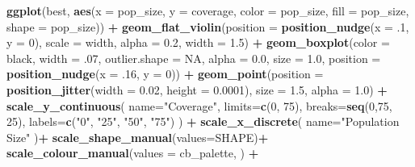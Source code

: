 \documentclass[
]{book}
\newenvironment{Shaded}{\begin{snugshade}}{\end{snugshade}}
\newcommand{\AttributeTok}[1]{\textcolor[rgb]{0.13,0.29,0.53}{#1}}
\newcommand{\ConstantTok}[1]{\textcolor[rgb]{0.56,0.35,0.01}{#1}}
\newcommand{\DecValTok}[1]{\textcolor[rgb]{0.00,0.00,0.81}{#1}}
\newcommand{\FloatTok}[1]{\textcolor[rgb]{0.00,0.00,0.81}{#1}}
\newcommand{\FunctionTok}[1]{\textcolor[rgb]{0.13,0.29,0.53}{\textbf{#1}}}
\newcommand{\NormalTok}[1]{#1}
\newcommand{\SpecialCharTok}[1]{\textcolor[rgb]{0.81,0.36,0.00}{\textbf{#1}}}
\newcommand{\StringTok}[1]{\textcolor[rgb]{0.31,0.60,0.02}{#1}}
\begin{document}
\begin{Shaded}
\begin{Highlighting}[]
\FunctionTok{ggplot}\NormalTok{(best, }\FunctionTok{aes}\NormalTok{(}\AttributeTok{x =}\NormalTok{ pop\_size, }\AttributeTok{y =}\NormalTok{ coverage, }\AttributeTok{color =}\NormalTok{ pop\_size, }\AttributeTok{fill =}\NormalTok{ pop\_size, }\AttributeTok{shape =}\NormalTok{ pop\_size)) }\SpecialCharTok{+}
  \FunctionTok{geom\_flat\_violin}\NormalTok{(}\AttributeTok{position =} \FunctionTok{position\_nudge}\NormalTok{(}\AttributeTok{x =}\NormalTok{ .}\DecValTok{1}\NormalTok{, }\AttributeTok{y =} \DecValTok{0}\NormalTok{), }\AttributeTok{scale =} \StringTok{\textquotesingle{}width\textquotesingle{}}\NormalTok{, }\AttributeTok{alpha =} \FloatTok{0.2}\NormalTok{, }\AttributeTok{width =} \FloatTok{1.5}\NormalTok{) }\SpecialCharTok{+}
  \FunctionTok{geom\_boxplot}\NormalTok{(}\AttributeTok{color =} \StringTok{\textquotesingle{}black\textquotesingle{}}\NormalTok{, }\AttributeTok{width =}\NormalTok{ .}\DecValTok{07}\NormalTok{, }\AttributeTok{outlier.shape =} \ConstantTok{NA}\NormalTok{, }\AttributeTok{alpha =} \FloatTok{0.0}\NormalTok{, }\AttributeTok{size =} \FloatTok{1.0}\NormalTok{, }\AttributeTok{position =} \FunctionTok{position\_nudge}\NormalTok{(}\AttributeTok{x =}\NormalTok{ .}\DecValTok{16}\NormalTok{, }\AttributeTok{y =} \DecValTok{0}\NormalTok{)) }\SpecialCharTok{+}
  \FunctionTok{geom\_point}\NormalTok{(}\AttributeTok{position =} \FunctionTok{position\_jitter}\NormalTok{(}\AttributeTok{width =} \FloatTok{0.02}\NormalTok{, }\AttributeTok{height =} \FloatTok{0.0001}\NormalTok{), }\AttributeTok{size =} \FloatTok{1.5}\NormalTok{, }\AttributeTok{alpha =} \FloatTok{1.0}\NormalTok{) }\SpecialCharTok{+}
  \FunctionTok{scale\_y\_continuous}\NormalTok{(}
    \AttributeTok{name=}\StringTok{"Coverage"}\NormalTok{,}
    \AttributeTok{limits=}\FunctionTok{c}\NormalTok{(}\DecValTok{0}\NormalTok{, }\DecValTok{75}\NormalTok{),}
    \AttributeTok{breaks=}\FunctionTok{seq}\NormalTok{(}\DecValTok{0}\NormalTok{,}\DecValTok{75}\NormalTok{, }\DecValTok{25}\NormalTok{),}
    \AttributeTok{labels=}\FunctionTok{c}\NormalTok{(}\StringTok{"0"}\NormalTok{, }\StringTok{"25"}\NormalTok{, }\StringTok{"50"}\NormalTok{, }\StringTok{"75"}\NormalTok{)}
\NormalTok{  ) }\SpecialCharTok{+}
  \FunctionTok{scale\_x\_discrete}\NormalTok{(}
    \AttributeTok{name=}\StringTok{"Population Size"}
\NormalTok{  )}\SpecialCharTok{+}
  \FunctionTok{scale\_shape\_manual}\NormalTok{(}\AttributeTok{values=}\NormalTok{SHAPE)}\SpecialCharTok{+}
  \FunctionTok{scale\_colour\_manual}\NormalTok{(}\AttributeTok{values =}\NormalTok{ cb\_palette, ) }\SpecialCharTok{+}

\end{Highlighting}
\end{Shaded}
\end{document}
